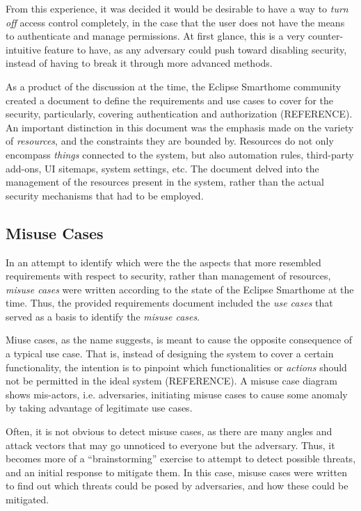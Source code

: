 \documentclass[12pt]{article}
\begin{document}
From this experience, it was decided it would be desirable to have a way to \emph{turn off} access control completely, in the case that the user does not have the means to authenticate and manage permissions. At first glance, this is a very counter-intuitive feature to have, as any adversary could push toward disabling security, instead of having to break it through more advanced methods. 

As a product of the discussion at the time, the Eclipse Smarthome community created a document to define the requirements and use cases to cover for the security, particularly, covering authentication and authorization (REFERENCE). An important distinction in this document was the emphasis made on the variety of \emph{resources}, and the constraints they are bounded by. Resources do not only encompass \emph{things} connected to the system, but also automation rules, third-party add-ons, UI sitemaps, system settings, etc. The document delved into the management of the resources present in the system, rather than the actual security mechanisms that had to be employed. 

\subsection{Misuse Cases}

In an attempt to identify which were the the aspects that more resembled requirements with respect to security, rather than management of resources, \emph{misuse cases} were written according to the state of the Eclipse Smarthome at the time. Thus, the provided requirements document included the \emph{use cases} that served as a basis to identify the \emph{misuse cases}. 

Miuse cases, as the name suggests, is meant to cause the opposite consequence of a typical use case. That is, instead of designing the system to cover a certain functionality, the intention is to pinpoint which functionalities or \emph{actions} should not be permitted in the ideal system (REFERENCE). A misuse case diagram shows mis-actors, i.e. adversaries, initiating misuse cases to cause some anomaly by taking advantage of legitimate use cases.

Often, it is not obvious to detect misuse cases, as there are many angles and attack vectors that may go unnoticed to everyone but the adversary. Thus, it becomes more of a ``brainstorming'' exercise to attempt to detect possible threats, and an initial response to mitigate them. In this case, misuse cases were written to find out which threats could be posed by adversaries, and how these could be mitigated.
\end{document}

